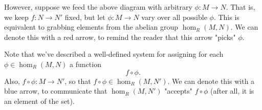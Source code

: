 \begin{minipage}{0.6\textwidth}
    However, suppose we feed the above diagram with arbitrary $\phi: M
    \to N$. That is, we keep $f: N \to N'$ fixed, but let $\phi: M
    \to 
    N$ vary over all possible $\phi$. This is equivalent to grabbing
    elements from the abelian group $\hom_R(M, N)$. We can denote
    this with a red arrow, to remind the reader that this arrow
    "picks" $\phi$. 
\end{minipage}
\hfill
\begin{minipage}{0.4\textwidth}
    \begin{center}
    \end{center}
\end{minipage}

\begin{minipage}{0.6\textwidth}
    Note that we've described a well-defined system for assigning for each $\phi
    \in \hom_R(M, N)$ a function 
    \[ 
        f \circ \phi.
    \] 
    Also, $f \circ \phi
    : M \to N'$, so that $f \circ \phi \in \hom_R(M, N')$. We can
    denote this with a blue arrow, to communicate that
    $\hom_R(M,N')$ "accepts" $f \circ \phi$ (after all, it is an element of
    the set).
\end{minipage}
\hfill
\begin{minipage}{0.4\textwidth}
    \begin{center}
    \end{center}
\end{minipage}
\vspace{0.5cm}

